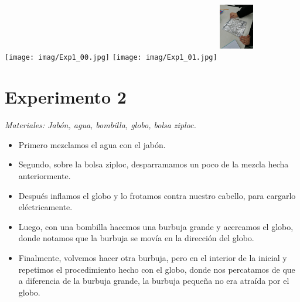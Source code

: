 \documentclass[]{article}
\newenvironment{Figura}
  {\par\medskip\noindent\minipage{\linewidth}}
  {\endminipage\par\medskip}
\begin{document}
\begin{multicols*}{2}[\setlength{columnsep}{3cm}]
\begin{Figura}
    \centering
    \texttt{[image: imag/Exp1\_00.jpg]}
    \texttt{[image: imag/Exp1\_01.jpg]}
    \includegraphics[width=1.5cm, height=3cm]{imag/Exp1_02.jpg}
\end{Figura}





\section*{Experimento 2}
\textit{Materiales: Jabón, agua, bombilla, globo, bolsa ziploc.}
\begin{itemize}
    \item Primero mezclamos el agua con el jabón.
    \item Segundo, sobre la bolsa ziploc, desparramamos un poco de la mezcla hecha anteriormente.
    \item Después inflamos el globo y lo frotamos contra nuestro cabello, para cargarlo eléctricamente.
    \item Luego, con una bombilla hacemos una burbuja grande y acercamos el globo, donde notamos que la burbuja se movía en la dirección del globo.
    \item Finalmente, volvemos hacer otra burbuja, pero en el interior de la inicial y repetimos el procedimiento hecho con el globo, donde nos percatamos de que a diferencia
    de la burbuja grande, la burbuja pequeña no era atraída por el globo.
\end{itemize}


\end{multicols*}
\end{document}
